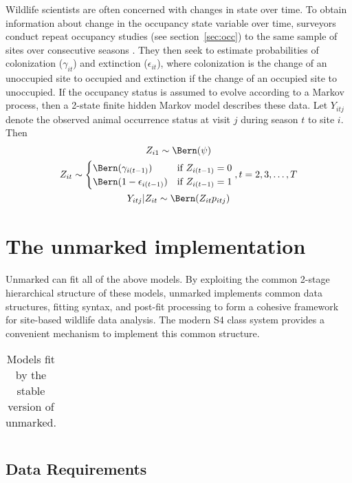Wildlife scientists are often concerned with changes in state over
time.  To obtain information about change in the occupancy state
variable over time, surveyors conduct repeat occupancy studies (see
section~\ref{sec:occ}) to the same sample of sites over consecutive
seasons \citep{mackenzie_estimating_2003}.  They then seek to estimate
probabilities of colonization ($\gamma_{it}$) and extinction
($\epsilon_{it}$), where colonization is the change of an unoccupied
site to occupied and extinction if the change of an occupied site to
unoccupied.  If the occupancy status is assumed to evolve according to
a Markov process, then a 2-state finite hidden Markov model describes
these data.  Let $Y_{itj}$ denote the observed animal occurrence
status at visit $j$ during season $t$ to site $i$.  Then
\begin{gather}
  Z_{i1} \sim \Bern(\psi) \\
  Z_{it} \sim
  \begin{cases}
    \Bern(\gamma_{i(t-1)}) & \text{if $Z_{i(t-1)} = 0$} \\
    \Bern(1-\epsilon_{i(t-1)}) & \text{if $Z_{i(t-1)} = 1$}
  \end{cases}, t=2,3,\dots,T \\
  Y_{itj} | Z_{it} \sim \Bern(Z_{it} p_{itj})
\end{gather}


\section{The unmarked implementation}

Unmarked can fit all of the above models.  By exploiting the common
2-stage hierarchical structure of these models, unmarked
implements common data structures, fitting syntax, and post-fit
processing to form a cohesive framework for site-based wildlife data
analysis.  The modern S4 class system
\citep{chambers_software_2008} provides a convenient mechanism to implement this
common structure.

\begin{table}
  \caption{Models fit by the stable version of unmarked.}
\begin{tabular}{cc}

\end{tabular}
\end{table}

\subsection{Data Requirements}

